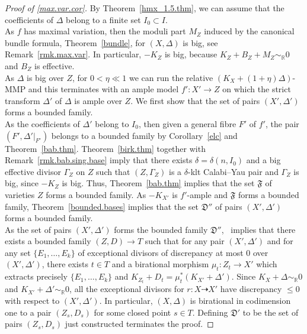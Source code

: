 \documentclass{amsart}[12pt,a4paper]
\theoremstyle{definition}
\newcommand{\rr}{\mathbb{R}}
\begin{document}
\begin{proof}[Proof of \ref{max.var.cor}]
By Theorem~\ref{hmx_1.5.thm}, we can assume that the coefficients of $\Delta$ belong to a finite set $I_0 \subset I$.
\\
As $f$ has maximal variation, then the moduli part $M_Z$ induced by the canonical bundle formula, Theorem~\ref{bundle}, for $(X, \Delta)$ is big, see Remark~\ref{rmk.max.var}.
In particular, $-K_Z$ is big, because $K_Z+B_Z+M_Z \sim_{\mathbb{R}}0$ and $B_Z$ is effective.
\\
As $\Delta$ is big over $Z$, for $0< \eta \ll 1$ we can run the relative $(K_X+(1+\eta)\Delta)$-MMP and this terminates with an ample model $f' \colon X' \to Z$ on which the strict transform $\Delta'$ of $\Delta$ is ample over $Z$.
We first show that the set of pairs $(X', \Delta')$ forms a bounded family.
\\
As the coefficients of $\Delta'$ belong to $I_0$, then given a general fibre $F'$ of $f'$, the pair $(F', \Delta'\vert_{F'})$ belongs to a bounded family by Corollary~\ref{elc} and Theorem~\ref{bab.thm}.
Theorem~\ref{birk.thm} together with Remark~\ref{rmk.bab.sing.base} imply that there exists $\delta=\delta(n, I_0)$ and a big effective divisor $\Gamma_Z$ on $Z$ such that $(Z, \Gamma_Z)$ is a $\delta$-klt Calabi--Yau pair and $\Gamma_Z$ is big, since $-K_Z$ is big.
Thus, Theorem~\ref{bab.thm} implies that the set $\mathfrak{F}$ of varieties $Z$ forms a bounded family.
As $-K_{X'}$ is $f'$-ample and $\mathfrak{F}$ forms a bounded family, Theorem~\ref{bounded.bases} implies that the set $\mathfrak{D}''$ of pairs $(X', \Delta')$ forms a bounded family.
\\
As the set of pairs $(X', \Delta')$ forms the bounded family $\mathfrak{D}''$,~\cite[Proposition~2.5]{HX14} implies that there exists a bounded family $(Z,D)\rightarrow T$ such that for any pair $(X',\Delta')$ and for any set $\{E_1, \dots, E_k\}$ of exceptional divisors of discrepancy at most $0$ over $(X', \Delta')$, there exists $t\in T$ and a birational morphism $\mu_t : Z_t \rightarrow X'$ which extracts precisely $\{E_1, \dots, E_k\}$ and $K_{Z_t}+D_t=\mu_t^* (K_{X'} +\Delta')$. 
Since $K_X +\Delta \sim_\rr 0$ and $K_{X'} +\Delta' \sim_\rr 0$, all the exceptional divisors for $r \colon X \dashrightarrow X'$ have discrepancy $\leq 0$ with respect to $(X', \Delta')$.
In particular, $(X, \Delta)$ is birational in codimension one to a pair $(Z_s, D_s)$ for some closed point $s \in T$.
Defining $\mathfrak{D}'$ to be the set of pairs $(Z_s, D_s)$ just constructed terminates the proof.
\end{proof}
\end{document}

